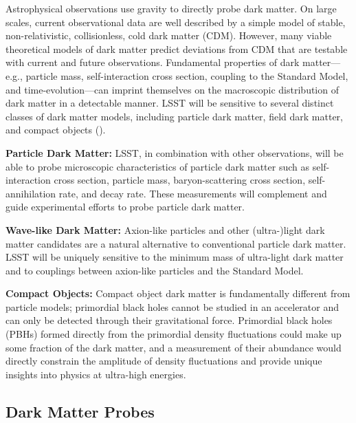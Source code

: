 \documentclass[12pt]{article}
\begin{document}
Astrophysical observations use gravity to directly probe dark matter. 
On large scales, current observational data are well described by a simple model of stable, non-relativistic, collisionless, cold dark matter (CDM).
However, many viable theoretical models of dark matter predict deviations from CDM that are testable with current and future observations.
Fundamental properties of dark matter---e.g., particle mass, self-interaction cross section, coupling to the Standard Model, and time-evolution---can imprint themselves on the macroscopic distribution of dark matter in a detectable manner. LSST will be sensitive to several distinct classes of dark matter models, including particle dark matter, field dark matter, and compact objects ().

\noindent \textbf{Particle Dark Matter:} LSST, in combination with other observations, will be able to probe microscopic characteristics of particle dark matter such as self-interaction cross section, particle mass, baryon-scattering cross section, self-annihilation rate, and decay rate. These measurements will complement and guide experimental efforts to probe particle dark matter.


\noindent \textbf{Wave-like Dark Matter:} Axion-like particles and other (ultra-)light dark matter candidates are a natural alternative to conventional particle dark matter. LSST will be uniquely sensitive to the minimum mass of ultra-light dark matter and to couplings between axion-like particles and the Standard Model.

\noindent \textbf{Compact Objects:} Compact object dark matter is fundamentally different from particle models; primordial black holes cannot be studied in an accelerator and can only be detected through their gravitational force. 
Primordial black holes (PBHs) formed directly from the primordial density fluctuations could make up some fraction of the dark matter, and a measurement of their abundance would directly constrain the amplitude of density fluctuations and provide unique insights into physics at ultra-high energies.


\vspace{-1em} \subsection*{Dark Matter Probes} \vspace{-0.5em}
\end{document}
